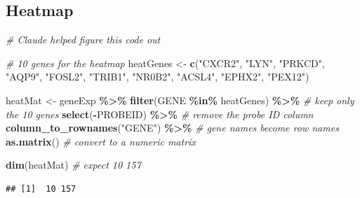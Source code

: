 \documentclass[
]{article}
\newenvironment{Shaded}{\begin{snugshade}}{\end{snugshade}}
\newcommand{\CommentTok}[1]{\textcolor[rgb]{0.56,0.35,0.01}{\textit{#1}}}
\newcommand{\FunctionTok}[1]{\textcolor[rgb]{0.13,0.29,0.53}{\textbf{#1}}}
\newcommand{\NormalTok}[1]{#1}
\newcommand{\OtherTok}[1]{\textcolor[rgb]{0.56,0.35,0.01}{#1}}
\newcommand{\SpecialCharTok}[1]{\textcolor[rgb]{0.81,0.36,0.00}{\textbf{#1}}}
\newcommand{\StringTok}[1]{\textcolor[rgb]{0.31,0.60,0.02}{#1}}
\begin{document}
\subsection{Heatmap}\label{heatmap}

\begin{Shaded}
\begin{Highlighting}[]
\CommentTok{\# Claude helped figure this code out}

\CommentTok{\# 10 genes for the heatmap}
\NormalTok{heatGenes }\OtherTok{\textless{}{-}} \FunctionTok{c}\NormalTok{(}\StringTok{"CXCR2"}\NormalTok{, }\StringTok{"LYN"}\NormalTok{, }\StringTok{"PRKCD"}\NormalTok{, }\StringTok{"AQP9"}\NormalTok{, }\StringTok{"FOSL2"}\NormalTok{,}
               \StringTok{"TRIB1"}\NormalTok{, }\StringTok{"NR0B2"}\NormalTok{, }\StringTok{"ACSL4"}\NormalTok{, }\StringTok{"EPHX2"}\NormalTok{, }\StringTok{"PEX12"}\NormalTok{)}

\NormalTok{heatMat }\OtherTok{\textless{}{-}}\NormalTok{ geneExp }\SpecialCharTok{\%\textgreater{}\%}
  \FunctionTok{filter}\NormalTok{(GENE }\SpecialCharTok{\%in\%}\NormalTok{ heatGenes) }\SpecialCharTok{\%\textgreater{}\%}      \CommentTok{\# keep only the 10 genes}
  \FunctionTok{select}\NormalTok{(}\SpecialCharTok{{-}}\NormalTok{PROBEID) }\SpecialCharTok{\%\textgreater{}\%}                 \CommentTok{\# remove the probe ID column}
  \FunctionTok{column\_to\_rownames}\NormalTok{(}\StringTok{"GENE"}\NormalTok{) }\SpecialCharTok{\%\textgreater{}\%}       \CommentTok{\# gene names become row names}
  \FunctionTok{as.matrix}\NormalTok{()                          }\CommentTok{\# convert to a numeric matrix}

\FunctionTok{dim}\NormalTok{(heatMat) }\CommentTok{\# expect 10 157}
\end{Highlighting}
\end{Shaded}

\begin{verbatim}
## [1]  10 157
\end{verbatim}
\end{document}
